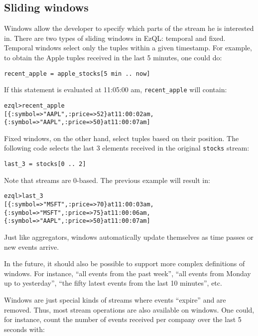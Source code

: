 \documentclass{report}
\newenvironment{evaluation}
{
  \framed
  \begin{alltt}
}
{
  \end{alltt}
  \endframed
}
\begin{document}
\subsection{Sliding windows}
\label{sec:sliding-windows}

Windows allow the developer to specify which parts of the stream he is
interested in. There are two types of sliding windows in EzQL:
temporal and fixed. Temporal windows select only the tuples within a
given timestamp. For example, to obtain the Apple tuples received in
the last 5 minutes, one could do:

\begin{verbatim}
recent_apple = apple_stocks[5 min .. now]
\end{verbatim}

If this statement is evaluated at 11:05:00 am, \verb=recent_apple=
will contain:

\begin{evaluation}
ezql> recent_apple
[\{ :symbol => "AAPL", :price => 52 \} at 11:00:02 am,
 \{ :symbol => "AAPL", :price => 50 \} at 11:00:07 am]
\end{evaluation}

Fixed windows, on the other hand, select tuples based on their
position. The following code selects the last 3 elements received in
the original \verb=stocks= stream:

\begin{verbatim}
last_3 = stocks[0 .. 2]
\end{verbatim}

Note that streams are 0-based. The previous example will result in:

\begin{evaluation}
ezql> last_3
[\{ :symbol => "MSFT", :price => 70 \} at 11:00:03 am,
 \{ :symbol => "MSFT", :price => 75 \} at 11:00:06 am,
 \{ :symbol => "AAPL", :price => 50 \} at 11:00:07 am]
\end{evaluation}

Just like aggregators, windows automatically update themselves as time
passes or new events arrive.

In the future, it should also be possible to support more complex
definitions of windows. For instance, ``all events from the past
week'', ``all events from Monday up to yesterday'', ``the fifty latest
events from the last 10 minutes'', etc.

Windows are just special kinds of streams where events ``expire'' and
are removed. Thus, most stream operations are also available on
windows. One could, for instance, count the number of events received
per company over the last 5 seconds with:
\end{document}

